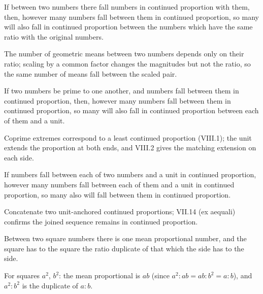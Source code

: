 \begin{claim}
\label{prop:VIII.8}
If between two numbers there fall numbers in continued proportion
with them, then, however many numbers fall between them in continued
proportion, so many will also fall in continued proportion between
the numbers which have the same ratio with the original numbers.
\end{claim}
\begin{evidence}
\label{ev:VIII.8}
The number of geometric means between two numbers depends only on
their ratio; scaling by a common factor changes the magnitudes but
not the ratio, so the same number of means fall between the scaled
pair.
\end{evidence}

\begin{claim}
\label{prop:VIII.9}
If two numbers be prime to one another, and numbers fall between them
in continued proportion, then, however many numbers fall between them
in continued proportion, so many will also fall in continued
proportion between each of them and a unit.
\end{claim}
\begin{evidence}
\label{ev:VIII.9}
Coprime extremes correspond to a least continued proportion (VIII.1);
the unit extends the proportion at both ends, and VIII.2 gives the
matching extension on each side.
\end{evidence}

\begin{claim}
\label{prop:VIII.10}
If numbers fall between each of two numbers and a unit in continued
proportion, however many numbers fall between each of them and a
unit in continued proportion, so many also will fall between them in
continued proportion.
\end{claim}
\begin{evidence}
\label{ev:VIII.10}
Concatenate two unit-anchored continued proportions; VII.14 (ex
aequali) confirms the joined sequence remains in continued
proportion.
\end{evidence}

\begin{claim}
\label{prop:VIII.11}
Between two square numbers there is one mean proportional number, and
the square has to the square the ratio duplicate of that which the
side has to the side.
\end{claim}
\begin{evidence}
\label{ev:VIII.11}
For squares $a^2$, $b^2$: the mean proportional is $ab$ (since $a^2 :
ab = ab : b^2 = a : b$), and $a^2 : b^2$ is the duplicate of $a : b$.
\end{evidence}

